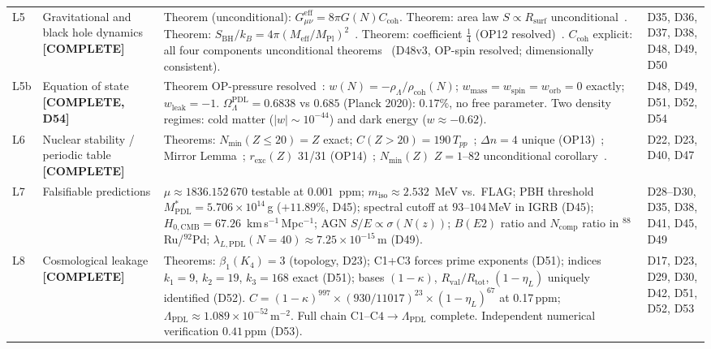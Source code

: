 \documentclass[11pt,a4paper]{article}
\newcommand{\Rval}{R_{\mathrm{val}}}
\theoremstyle{plain}
\theoremstyle{definition}
\theoremstyle{remark}
\newcommand{\Rsurf}{R_{\mathrm{surf}}}
\newcommand{\Rtot}{R_{\mathrm{tot}}}
\newcommand{\SBH}{S_{\mathrm{BH}}}
\newcommand{\Meff}{M_{\mathrm{eff}}}
\newcommand{\MPl}{M_{\mathrm{Pl}}}
\newcommand{\Tpp}{T_{pp}}
\newcommand{\rhocoh}{\rho_{\mathrm{coh}}}
\newcommand{\Ccoh}{C_{\mathrm{coh}}}
\begin{document}
\begin{longtable}{L{0.6cm}L{3.0cm}L{5.5cm}L{4.0cm}}
L5 & Gravitational and black hole dynamics \textbf{[COMPLETE]} & \textcolor{proofblue}{Theorem} (unconditional): $G_{\mu\nu}^{\mathrm{eff}}=8\pi G(N)\Ccoh$. \textcolor{proofblue}{Theorem}: area law $S\propto\Rsurf$ unconditional~\cite{D37}. \textcolor{proofblue}{Theorem}: $\SBH/k_B=4\pi(\Meff/\MPl)^2$~\cite{D38}. \textcolor{proofblue}{Theorem}: coefficient $\tfrac{1}{4}$ (OP12 resolved)~\cite{D50}. $\Ccoh$ explicit: all four components unconditional theorems~\cite{D48,D51,D52} (D48v3, OP-spin resolved; dimensionally consistent). & D35, D36, D37, D38, D48, D49, D50\\[0.4em]
L5b & Equation of state \textbf{[COMPLETE, D54]} & \textcolor{proofblue}{Theorem} OP-pressure resolved~\cite{D54}: $w(N) = -\rho_\Lambda/\rhocoh(N)$; $w_{\mathrm{mass}}=w_{\mathrm{spin}}=w_{\mathrm{orb}}=0$ exactly; $w_{\mathrm{leak}}=-1$. $\Omega_\Lambda^{\mathrm{PDL}}=0.6838$ vs $0.685$ (Planck 2020): $0.17\%$, no free parameter. Two density regimes: cold matter ($|w|\sim 10^{-44}$) and dark energy ($w \approx -0.62$). & D48, D49, D51, D52, D54\\[0.4em]
L6 & Nuclear stability / periodic table \textbf{[COMPLETE]} & \textcolor{proofblue}{Theorems}: $N_{\min}(Z\leq20)=Z$ exact; $C(Z>20)=190\,\Tpp$~\cite{D40}; $\Delta n=4$ unique (OP13)~\cite{D47}; Mirror Lemma~\cite{D47}; $r_{\mathrm{exc}}(Z)$ 31/31 (OP14)~\cite{D47}; $N_{\min}(Z)$ $Z=1$--82 unconditional corollary~\cite{D47}. & D22, D23, D40, D47\\[0.4em]
L7 & Falsifiable predictions & $\mu\approx 1836.152\,670$ testable at $0.001$~ppm; $m_{\mathrm{iso}}\approx 2.532$~MeV vs.\ FLAG; PBH threshold $M^*_{\mathrm{PDL}}=5.706\times10^{14}$\,g ($+11.89\%$, D45); spectral cutoff at $93$--$104$\,MeV in IGRB (D45); $H_{0,\mathrm{CMB}}=67.26$~km\,s$^{-1}$\,Mpc$^{-1}$; AGN $S/E \propto \sigma(N(z))$; $B(E2)$ ratio and $N_{\mathrm{comp}}$ ratio in $^{88}$Ru/$^{92}$Pd; $\lambda_{L,\mathrm{PDL}}(N=40) \approx 7.25\times10^{-15}$\,m (D49). & D28--D30, D35, D38, D41, D45, D49\\[0.3em]
L8 & Cosmological leakage \textbf{[COMPLETE]} & \textcolor{proofblue}{Theorems}: $\beta_1(K_4)=3$ (topology, D23); C1+C3 forces prime exponents (D51); indices $k_1=9$, $k_2=19$, $k_3=168$ exact (D51); bases $(1-\kappa)$, $\Rval/\Rtot$, $(1-\eta_L)$ uniquely identified (D52). $C=(1-\kappa)^{997}\times(930/11017)^{23}\times(1-\eta_L)^{67}$ at 0.17\,ppm; $\Lambda_{\mathrm{PDL}}\approx 1.089\times10^{-52}$\,m$^{-2}$. Full chain $\mathrm{C1\text{--}C4}\to\Lambda_{\mathrm{PDL}}$ complete. Independent numerical verification $0.41$\,ppm (D53). & D17, D23, D29, D30, D42, D51, D52, D53\\[0.3em]

\end{longtable}
\end{document}
